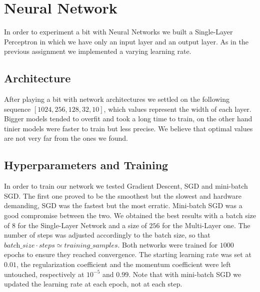 \documentclass[10pt,a4paper]{report}
\begin{document}
\section{Neural Network}
In order to experiment a bit with Neural Networks we built a Single-Layer Perceptron in which we have only an input layer and an output layer. As in the previous assignment we implemented a varying learning rate.
\subsection{Architecture}
After playing a bit with network architectures we settled on the following sequence $[1024, 256, 128, 32, 10]$, which values represent the width of each layer. Bigger models tended to overfit and took a long time to train, on the other hand tinier models were faster to train but less precise. We believe that optimal values are not very far from the ones we found.
\subsection{Hyperparameters and Training}
In order to train our network we tested Gradient Descent, SGD and mini-batch SGD. The first one proved to be the smoothest but the slowest and hardware demanding, SGD was the fastest but the most erratic. Mini-batch SGD was a good compromise between the two. We obtained the best results with a batch size of $8$ for the Single-Layer Network and a size of $256$ for the Multi-Layer one. The number of steps was adjusted accordingly to the batch size, so that $\textit{batch\_size} \cdot \textit{steps} \simeq \textit{training\_samples}$. Both networks were trained for $1000$ epochs to ensure they reached convergence. The starting learning rate was set at $0.01$, the regularization coefficient and the momentum coefficient were left untouched, respectively at $10^{-5}$ and $0.99$. Note that with mini-batch SGD we updated the learning rate at each epoch, not at each step. 
\end{document}
